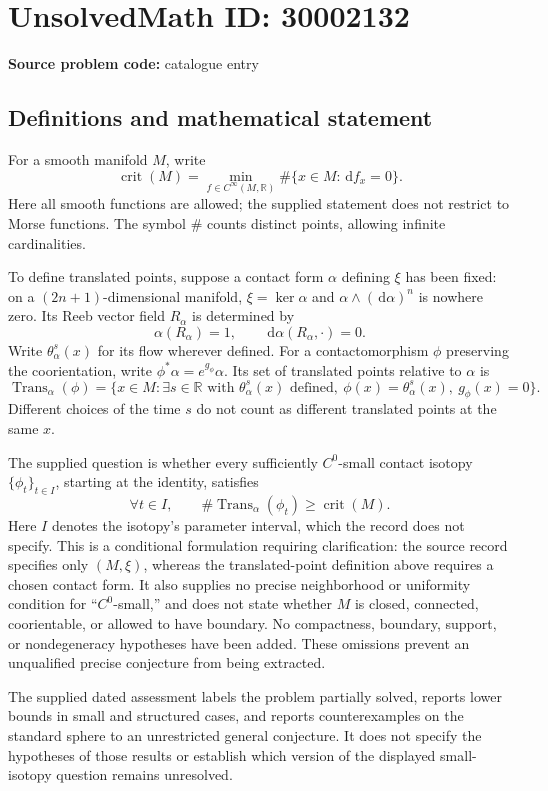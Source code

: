 \documentclass[11pt]{article}
\newcommand{\R}{\mathbb{R}}
\newcommand{\dd}{\,\mathrm{d}}
\begin{document}
\section*{UnsolvedMath ID: 30002132}
\textbf{Source problem code:} catalogue entry
\subsection{Definitions and mathematical statement}
For a smooth manifold \(M\), write
\[
\operatorname{crit}(M)=\min_{f\in C^\infty(M,\R)}\#\{x\in M:\dd f_x=0\}.
\]
Here all smooth functions are allowed; the supplied statement does not restrict to Morse functions. The symbol \(\#\) counts distinct points, allowing infinite cardinalities.

To define translated points, suppose a contact form \(\alpha\) defining \(\xi\) has been fixed: on a \((2n+1)\)-dimensional manifold, \(\xi=\ker\alpha\) and \(\alpha\wedge(\dd\alpha)^n\) is nowhere zero. Its Reeb vector field \(R_\alpha\) is determined by
\[
\alpha(R_\alpha)=1,\qquad \dd\alpha(R_\alpha,\cdot)=0.
\]
Write \(\theta_\alpha^s(x)\) for its flow wherever defined. For a contactomorphism \(\phi\) preserving the coorientation, write \(\phi^*\alpha=e^{g_\phi}\alpha\). Its set of translated points relative to \(\alpha\) is
\[
\operatorname{Trans}_\alpha(\phi)=\{x\in M:\exists s\in\R\text{ with }\theta_\alpha^s(x)\text{ defined},\ \phi(x)=\theta_\alpha^s(x),\ g_\phi(x)=0\}.
\]
Different choices of the time \(s\) do not count as different translated points at the same \(x\).

The supplied question is whether every sufficiently \(C^0\)-small contact isotopy \(\{\phi_t\}_{t\in I}\), starting at the identity, satisfies
\[
\forall t\in I,\qquad
\#\operatorname{Trans}_\alpha(\phi_t)\geq\operatorname{crit}(M).
\]
Here \(I\) denotes the isotopy's parameter interval, which the record does not specify. This is a conditional formulation requiring clarification: the source record specifies only \((M,\xi)\), whereas the translated-point definition above requires a chosen contact form. It also supplies no precise neighborhood or uniformity condition for ``\(C^0\)-small,'' and does not state whether \(M\) is closed, connected, coorientable, or allowed to have boundary. No compactness, boundary, support, or nondegeneracy hypotheses have been added. These omissions prevent an unqualified precise conjecture from being extracted.

The supplied dated assessment labels the problem partially solved, reports lower bounds in small and structured cases, and reports counterexamples on the standard sphere to an unrestricted general conjecture. It does not specify the hypotheses of those results or establish which version of the displayed small-isotopy question remains unresolved.
\end{document}

